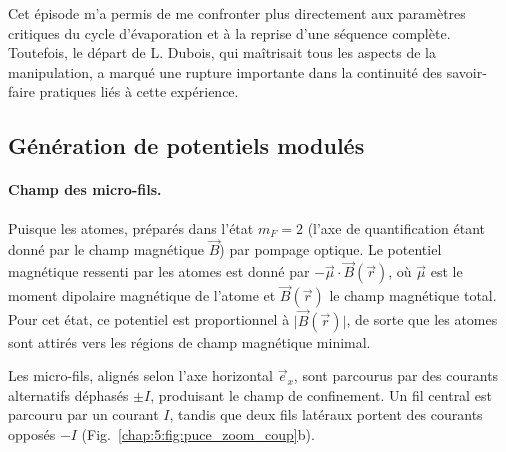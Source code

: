 \medskip

Cet épisode m’a permis de me confronter plus directement aux paramètres critiques du cycle d’évaporation et à la reprise d’une séquence complète. Toutefois, le départ de L. Dubois, qui maîtrisait tous les aspects de la manipulation, a marqué une rupture importante dans la continuité des savoir-faire pratiques liés à cette expérience.





\subsection{Génération de potentiels modulés}


\paragraph{Champ des micro-fils.}
Puisque les atomes, préparés dans l'état $m_F = 2$  (l'axe de quantification étant donné par le champ magnétique $\vec{B}$) par pompage optique. Le potentiel magnétique ressenti par les atomes est donné par $-\vec{\mu} \cdot \vec{B}(\vec{r})$, où $\vec{\mu}$ est le moment dipolaire magnétique de l'atome et $\vec{B}(\vec{r})$ le champ magnétique total. Pour cet état, ce potentiel est proportionnel à $\vert \vec{B}(\vec{r}) \vert$, de sorte que les atomes sont attirés vers les régions de champ magnétique minimal.

\medskip  

Les micro-fils, alignés selon l’axe horizontal $\vec{e}_x$, sont parcourus par des courants alternatifs déphasés $\pm I$, produisant le champ de confinement. Un fil central est parcouru par un courant $I$, tandis que deux fils latéraux portent des courants opposés $-I$ (Fig.~\ref{chap:5:fig:puce_zoom_coup}b).



